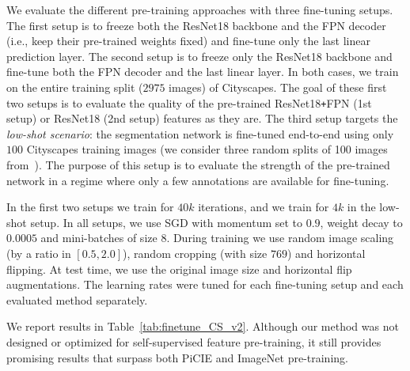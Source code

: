 \documentclass[runningheads]{llncs}
\def\Plus{\texttt{+}}
\begin{document}
We evaluate the different pre-training approaches with three 
fine-tuning setups.
The first setup is to freeze both the ResNet18 backbone and the FPN decoder (i.e., keep their pre-trained weights fixed) and fine-tune only the last linear prediction layer.
The second setup is to freeze only the ResNet18 backbone and fine-tune both the FPN decoder and the last linear layer.
In both cases, we train on the entire training split ($2975$ images) of Cityscapes.
The goal of these first two setups is to evaluate the quality of the pre-trained ResNet18\Plus FPN (1st setup) or ResNet18 (2nd setup) features as they are.
The third setup targets the \emph{low-shot scenario}: the segmentation network is  fine-tuned end-to-end using only $100$ Cityscapes training images (we consider three random splits of 100 images from~\cite{french2020semi}).
The purpose of this setup is to evaluate the strength of the pre-trained network in a regime where only a few annotations are available for fine-tuning. 

In the first two setups we train for 
$40k$ iterations, and we train for $4k$ in the low-shot setup.
In all setups, we use SGD with momentum set to $0.9$, weight decay to $0.0005$ and mini-batches of size $8$.
During training we use random image scaling (by a ratio in $[0.5, 2.0]$), random cropping (with size $769$) and horizontal flipping. At test time, we use the original image size and horizontal flip augmentations.
The learning rates were tuned for each fine-tuning setup and each evaluated method separately. 

We report results in Table~\ref{tab:finetune_CS_v2}.
Although our method was not designed or optimized for self-supervised feature pre-training, it still provides promising results that surpass both PiCIE and ImageNet pre-training. 
\end{document}
